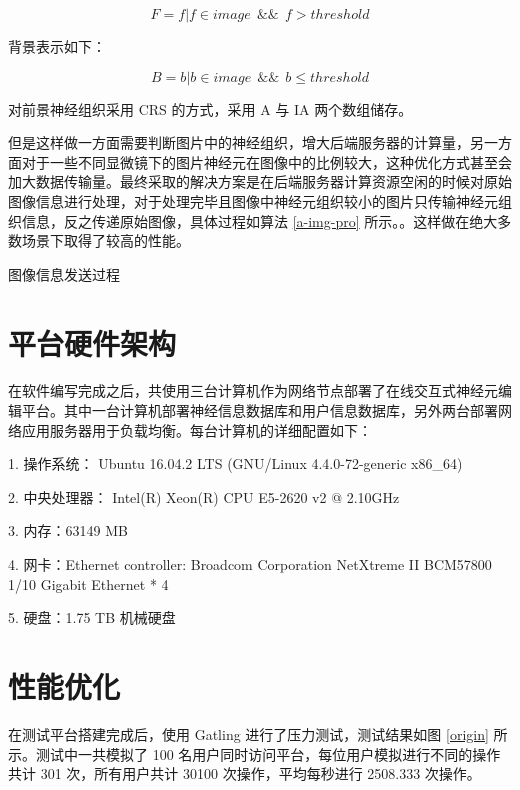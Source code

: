 $$F = {f | f \in image ~~ \&\& ~~ f > threshold} $$

背景表示如下：

$$B = {b | b \in image ~~ \&\& ~~ b \leq threshold} $$

对前景神经组织采用 CRS 的方式，采用 A 与 IA 两个数组储存。

但是这样做一方面需要判断图片中的神经组织，增大后端服务器的计算量，另一方面对于一些不同显微镜下的图片神经元在图像中的比例较大，这种优化方式甚至会加大数据传输量。最终采取的解决方案是在后端服务器计算资源空闲的时候对原始图像信息进行处理，对于处理完毕且图像中神经元组织较小的图片只传输神经元组织信息，反之传递原始图像，具体过程如算法 \ref{a-img-pro} 所示。。这样做在绝大多数场景下取得了较高的性能。

\begin{algorithm}
  \label{a-img-pro}
  \caption{图像信息发送过程}
  \begin{algorithmic}[1] %
    \ELSE
      \ENDIF
    \ENDIF
  \end{algorithmic}
\end{algorithm}

\section{平台硬件架构}
在软件编写完成之后，共使用三台计算机作为网络节点部署了在线交互式神经元编辑平台。其中一台计算机部署神经信息数据库和用户信息数据库，另外两台部署网络应用服务器用于负载均衡。每台计算机的详细配置如下：

1. 操作系统： Ubuntu 16.04.2 LTS (GNU/Linux 4.4.0-72-generic x86\_64)

2. 中央处理器： Intel(R) Xeon(R) CPU E5-2620 v2 @ 2.10GHz

3. 内存：63149 MB

4. 网卡：Ethernet controller: Broadcom Corporation NetXtreme II BCM57800 1/10 Gigabit Ethernet * 4

5. 硬盘：1.75 TB 机械硬盘

\section{性能优化}

在测试平台搭建完成后，使用 Gatling 进行了压力测试，测试结果如图 \ref{origin} 所示。测试中一共模拟了 100 名用户同时访问平台，每位用户模拟进行不同的操作共计 301 次，所有用户共计 30100 次操作，平均每秒进行 2508.333 次操作。

